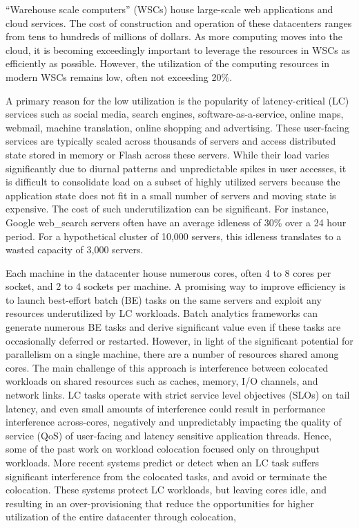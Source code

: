 \begin{bigabstract}
“Warehouse scale computers” (WSCs) house large-scale web applications and cloud services. The cost of construction and operation of these datacenters ranges from tens to hundreds of millions of dollars. As more computing moves into the cloud, it is becoming exceedingly important to leverage the resources in WSCs as efficiently as possible. However, the utilization of the computing resources in modern WSCs remains low, often not exceeding 20\%.

A primary reason for the low utilization is the popularity of latency-critical (LC) services such as social media, search engines, software-as-a-service, online maps, webmail, machine translation, online shopping and advertising. These user-facing services are typically scaled across thousands of servers and access distributed state stored in memory or Flash across these servers. While their load varies significantly due to diurnal patterns and unpredictable spikes in user accesses, it is difficult to consolidate load on a subset of highly utilized servers because the application state does not fit in a small number of servers and moving state is expensive. The cost of such underutilization can be significant. For instance, Google web\_search servers often have an average idleness of 30\% over a 24 hour period. For a hypothetical cluster of 10,000 servers, this idleness translates to a wasted capacity of 3,000 servers.

Each machine in the datacenter house numerous cores, often 4 to 8 cores per socket, and 2 to 4 sockets per machine.  A promising way to improve efficiency is to launch best-effort batch (BE) tasks on the same servers and exploit any resources underutilized by LC workloads. Batch analytics frameworks can generate numerous BE tasks and derive significant value even if these tasks are occasionally deferred or restarted. However, in light of the significant potential for parallelism on a single machine, there are a number of resources shared among cores. The main challenge of this approach is interference between colocated workloads on shared resources such as caches, memory, I/O channels, and network links. LC tasks operate with strict service level objectives (SLOs) on tail latency, and even small amounts of interference could result in performance interference across-cores, negatively and unpredictably impacting the quality of service (QoS) of user-facing and latency sensitive application threads. Hence, some of the past work on workload colocation focused only on throughput workloads. More recent systems predict or detect when an LC task suffers significant interference from the colocated tasks, and avoid or terminate the colocation. These systems protect LC workloads, but leaving cores idle, and resulting in an over-provisioning that reduce the opportunities for higher utilization of the entire datacenter through colocation, 


\end{bigabstract}
